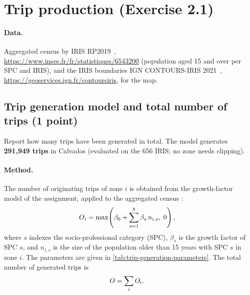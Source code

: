 \section{Trip production (Exercise 2.1)}\label{sec:trip-production}

\paragraph{Data.}
Aggregated census by IRIS RP2019~\cite{insee-census-aggregated}, \url{https://www.insee.fr/fr/statistiques/6543200}
(population aged 15 and over per SPC and IRIS), and the IRIS boundaries IGN CONTOURS-IRIS 2021~\cite{ign-contours-iris},
\url{https://geoservices.ign.fr/contoursiris}, for the map.

\subsection{Trip generation model and total number of trips (1 point)}

\begin{qa}{Report how many trips have been generated in total.}
The model generates \textbf{291{,}949 trips} in Calvados (evaluated on the 656 IRIS; no zone needs clipping).
\end{qa}

\paragraph{Method.}
The number of originating trips of zone $i$ is obtained from the growth-factor model of the assignment, applied to the
aggregated census \cite{insee-census-aggregated}:
\begin{equation}\label{eq:trip-generation}
  O_i = \max\!\left(\beta_0 + \sum_{s=1}^{8} \beta_s\, n_{i,s},\; 0\right),
\end{equation}
where $s$ indexes the socio-professional category (SPC), $\beta_s$ is the growth factor of SPC $s$, and $n_{i,s}$ is the
size of the population older than 15 years with SPC $s$ in zone $i$. The parameters are given in
\cref{tab:trip-generation-parameters}. The total number of generated trips is
\begin{equation}\label{eq:total-origins}
  O = \sum_i O_i .
\end{equation}

